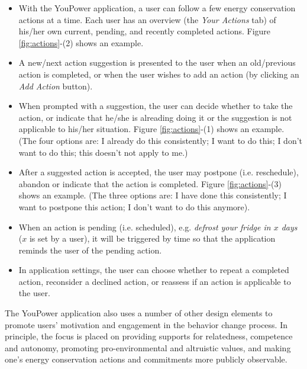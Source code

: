 \begin{itemize}
\item With the YouPower application, a user can follow a few energy conservation actions at a time. Each user has an overview (the \textit{Your Actions} tab) of his/her own current, pending, and recently completed actions. Figure \ref{fig:actions}-(2) shows an example. 
\item A new/next action suggestion is presented to the user when an old/previous action is completed, or when the user wishes to add an action (by clicking an \textit{Add Action} button). 
\item When prompted with a suggestion, the user can decide whether to take the action, or indicate that he/she is alreading doing it or the suggestion is not applicable to his/her situation. Figure \ref{fig:actions}-(1) shows an example. (The four options are: I already do this consistently; I want to do this; I don't want to do this; this doesn't not apply to me.) 
\item After a suggested action is accepted, the user may postpone (i.e. reschedule), abandon or indicate that the action is completed. Figure \ref{fig:actions}-(3) shows an example. (The three options are: I have done this consistently; I want to postpone this action; I don't want to do this anymore). 
\item When an action is pending (i.e. scheduled), e.g. \textit{defrost your fridge in $x$ days} ($x$ is set by a user), it will be triggered by time so that the application reminds the user of the pending action. 
\item In application settings, the user can choose whether to repeat a completed action, reconsider a declined action, or reassess if an action is applicable to the user.
\end{itemize}


The YouPower application also uses a number of other design elements to promote users' motivation and engagement in the behavior change process. In principle, the focus is placed on providing supports for relatedness, competence and autonomy, promoting pro-environmental and altruistic values, and making one's energy conservation actions and commitments more publicly observable. 

